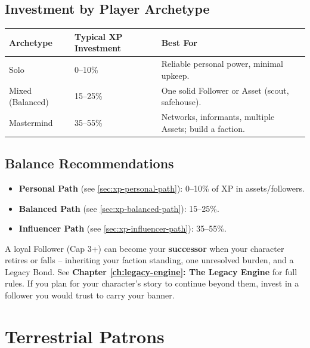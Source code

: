 \subsection*{Investment by Player Archetype}
\label{sec:invest-by-archetype}
\begin{center}
\begin{tabular}{lll}
\toprule
\textbf{Archetype} & \textbf{Typical XP Investment} & \textbf{Best For} \\
\midrule
Solo & 0--10\% & Reliable personal power, minimal upkeep. \\
Mixed (Balanced) & 15--25\% & One solid Follower or Asset (scout, safehouse). \\
Mastermind & 35--55\% & Networks, informants, multiple Assets; build a faction. \\
\bottomrule
\end{tabular}
\end{center}

\subsection*{Balance Recommendations}
\label{sec:asset-follower-balance}
\begin{itemize}
\item \textbf{Personal Path} (see \ref{sec:xp-personal-path}): 0--10\% of XP in assets/followers.
\item \textbf{Balanced Path} (see \ref{sec:xp-balanced-path}): 15--25\%.
\item \textbf{Influencer Path} (see \ref{sec:xp-influencer-path}): 35--55\%.
\end{itemize}

\begin{tcolorbox}[colback=red!5!white,colframe=red!75!black,title=Planning for Succession (The Legacy Engine),breakable]
A loyal Follower (Cap 3+) can become your \textbf{successor} when your character retires or falls -- inheriting your faction standing, one unresolved burden, and a Legacy Bond. See \textbf{Chapter \ref{ch:legacy-engine}: The Legacy Engine} for full rules. If you plan for your character's story to continue beyond them, invest in a follower you would trust to carry your banner.
\end{tcolorbox}

\section{Terrestrial Patrons}
\label{sec:terrestrial-patrons}

